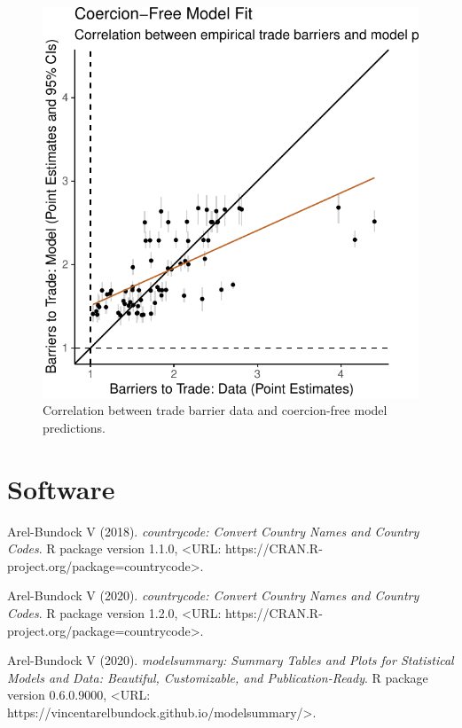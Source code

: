 \documentclass{puthesis}
\begin{document}
\begin{figure}
\centering
\includegraphics{figure/fit_mo-1.pdf}
\caption{Correlation between trade barrier data and coercion-free model
predictions. \label{fig:fit_mo}}
\end{figure}

\clearpage

\clearpage

\chapter*{Software}


\sloppy

Arel-Bundock V (2018). \emph{countrycode: Convert Country Names and
Country Codes}. R package version 1.1.0, \textless URL:
https://CRAN.R-project.org/package=countrycode\textgreater.

Arel-Bundock V (2020). \emph{countrycode: Convert Country Names and
Country Codes}. R package version 1.2.0, \textless URL:
https://CRAN.R-project.org/package=countrycode\textgreater.

Arel-Bundock V (2020). \emph{modelsummary: Summary Tables and Plots for
Statistical Models and Data: Beautiful, Customizable, and
Publication-Ready}. R package version 0.6.0.9000, \textless URL:
https://vincentarelbundock.github.io/modelsummary/\textgreater.
\end{document}
